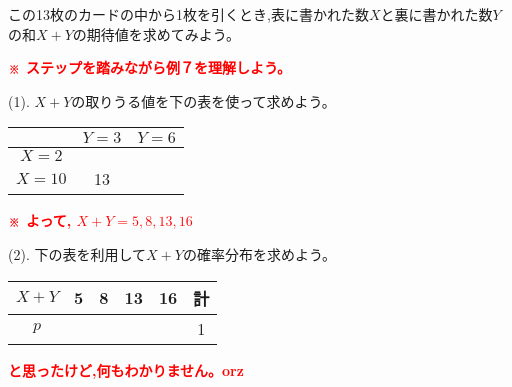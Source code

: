 \documentclass[landscape,a3paper,8pt]{ltjsarticle}
\newcommand{\RedBold}[1]{\textcolor{red}{\textbf{#1}}}
\begin{document}
\begin{multicols*}{4}
 この13枚のカードの中から1枚を引くとき,表に書かれた数$X$と裏に書かれた数$Y$の和$X+Y$の期待値を求めてみよう。

 
 \RedBold{※ ステップを踏みながら例７を理解しよう。}

 (1). $X+Y$の取りうる値を下の表を使って求めよう。
 
 \begin{ansBlockAuto}
  \begin{tabular}{|c|c|c|}\hline
   & $Y=3$ & $Y=6$\rule[-5mm]{0mm}{11mm}\\\hline
   $X=2$ & \hspace{2\zw} & \hspace{2\zw} \rule[-5mm]{0mm}{11mm}\\\hline
   $X=10$ & 13 & \rule[-5mm]{0mm}{11mm}\\\hline
  \end{tabular}
  
  \hfill\RedBold{※ よって, $X+Y = 5, 8, 13, 16$}
 \end{ansBlockAuto}
 
 (2). 下の表を利用して$X+Y$の確率分布を求めよう。
 
 \begin{ansBlockAuto}
  \begin{tabular}{|c|c|c|c|c|c|}\hline
   $X+Y$ & 5 & 8 & 13 & 16 & 計 \\\hline
   $p$ & \hspace{2\zw} & \hspace{2\zw} & \hspace{2\zw} & \hspace{2\zw} & 1\\\hline
  \end{tabular}
  
  \RedBold{と思ったけど,何もわかりません。orz}
 \end{ansBlockAuto}
 

\end{multicols*}
\end{document}
